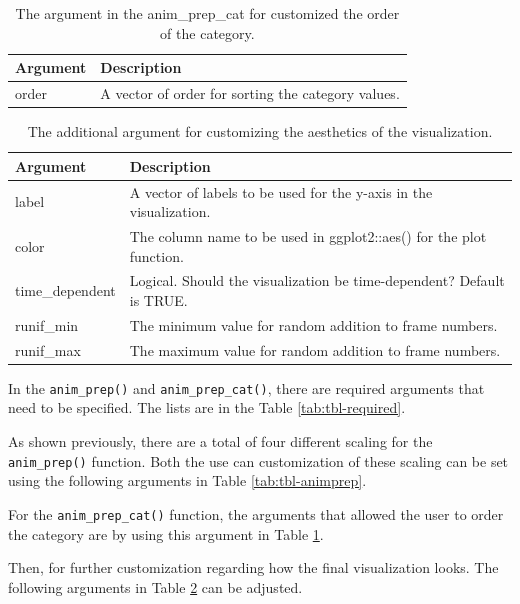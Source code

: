 \begin{table}

\caption{\label{tab:tbl-animprepcat}The argument in the anim\_prep\_cat for customized the order of the category.}
\centering
\begin{tabular}[t]{l|l}
\hline
Argument & Description\\
\hline
order & A vector of order for sorting the category values.\\
\hline
\end{tabular}
\end{table}

\begin{table}

\caption{\label{tab:tbl-visual}The additional argument for customizing the aesthetics of the visualization.}
\centering
\begin{tabular}[t]{l|l}
\hline
Argument & Description\\
\hline
label & A vector of labels to be used for the y-axis in the visualization.\\
\hline
color & The column name to be used in ggplot2::aes() for the plot function.\\
\hline
time\_dependent & Logical. Should the visualization be time-dependent? Default is TRUE.\\
\hline
runif\_min & The minimum value for random addition to frame numbers.\\
\hline
runif\_max & The maximum value for random addition to frame numbers.\\
\hline
\end{tabular}
\end{table}

In the \texttt{anim\_prep()} and \texttt{anim\_prep\_cat()}, there are required arguments that need to be specified. The lists are in the Table \ref{tab:tbl-required}.

As shown previously, there are a total of four different scaling for the \texttt{anim\_prep()} function. Both the use can customization of these scaling can be set using the following arguments in Table \ref{tab:tbl-animprep}.

For the \texttt{anim\_prep\_cat()} function, the arguments that allowed the user to order the category are by using this argument in Table \ref{tab:tbl-animprepcat}.

Then, for further customization regarding how the final visualization looks. The following arguments in Table \ref{tab:tbl-visual} can be adjusted.

